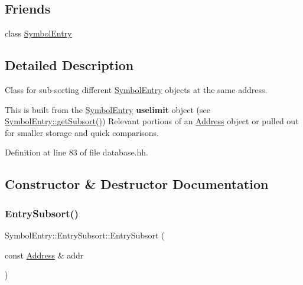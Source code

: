 \subsection*{Friends}
\begin{DoxyCompactItemize}
\item 
class \mbox{\hyperlink{class_symbol_entry_1_1_entry_subsort_a66ab73b76c4868b7a9981390ad794dbc}{Symbol\+Entry}}
\end{DoxyCompactItemize}


\subsection{Detailed Description}
Class for sub-\/sorting different \mbox{\hyperlink{class_symbol_entry}{Symbol\+Entry}} objects at the same address. 

This is built from the \mbox{\hyperlink{class_symbol_entry}{Symbol\+Entry}} {\bfseries{uselimit}} object (see \mbox{\hyperlink{class_symbol_entry_afb88a4dae96af6bb42c0bd0434d7e756}{Symbol\+Entry\+::get\+Subsort()}}) Relevant portions of an \mbox{\hyperlink{class_address}{Address}} object or pulled out for smaller storage and quick comparisons. 

Definition at line 83 of file database.\+hh.



\subsection{Constructor \& Destructor Documentation}
\mbox{\label{class_symbol_entry_1_1_entry_subsort_a37ee318e75dbbe9abaed154e1641b382}} 
\subsubsection{\texorpdfstring{EntrySubsort()}{EntrySubsort()}\hspace{0.1cm}{\footnotesize\ttfamily [1/4]}}
{\footnotesize\ttfamily Symbol\+Entry\+::\+Entry\+Subsort\+::\+Entry\+Subsort (\begin{DoxyParamCaption}\item[{const \mbox{\hyperlink{class_address}{Address}} \&}]{addr }\end{DoxyParamCaption})\hspace{0.3cm}{\ttfamily [inline]}}



